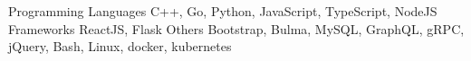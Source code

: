 
\begin{cvskills}
    \cvskill 
        {Programming Languages}
        {C++, Go, Python, JavaScript, TypeScript, NodeJS}
    \cvskill 
        {Frameworks}
        {ReactJS, Flask}
    \cvskill
        {Others}
        {Bootstrap, Bulma, MySQL, GraphQL, gRPC, jQuery, Bash, Linux, docker, kubernetes}
\end{cvskills}

